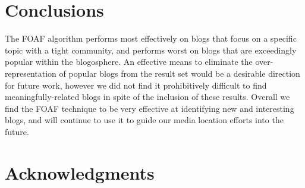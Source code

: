 \documentclass{sig-alternate}
\begin{document}
\section{Conclusions}


The FOAF algorithm performs most effectively on blogs that focus on a
specific topic with a tight community, and performs worst on blogs
that are exceedingly popular within the blogosphere.  An effective
means to eliminate the over-representation of popular blogs from the
result set would be a desirable direction for future work, however we
did not find it prohibitively difficult to find meaningfully-related
blogs in spite of the inclusion of these results. Overall we find the
FOAF technique to be very effective at identifying new and interesting
blogs, and will continue to use it to guide our media location efforts
into the future.



\section{Acknowledgments}

%


%
%

\end{document}
